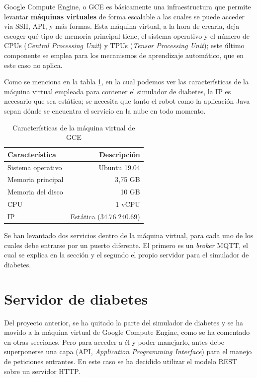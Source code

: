 \documentclass[12pt,spanish,listoffigures,listoftables]{tfgetsinf}
\begin{document}
Google Compute Engine, o GCE es básicamente una infraestructura que permite levantar \textbf{máquinas virtuales} de forma escalable a las cuales se puede acceder via SSH, API, y más formas. Esta máquina virtual, a la hora de crearla, deja escoger qué tipo de memoria principal tiene, el sistema operativo y el número de CPUs (\textit{Central Processing Unit}) y TPUs (\textit{Tensor Processing Unit}); este último componente se emplea para los mecanismos de aprendizaje automático, que en este caso no aplica.

Como se menciona en la tabla \ref{tabla:caracteristicasgce}, en la cual podemos ver las características de la máquina virtual empleada para contener el simulador de diabetes, la IP es necesario que sea estática; se necesita que tanto el robot como la aplicación Java sepan dónde se encuentra el servicio en la nube en todo momento. \\

\begin{table}[!h]
	\begin{center}
		\begin{tabular}{|l|r|}
			\hline 
			\textbf{Característica} & \textbf{Descripción} \\ 
			\hline 
			Sistema operativo & Ubuntu 19.04 \\ 
			\hline 
			Memoria principal & 3,75 GB \\ 
			\hline 
			Memoria del disco & 10 GB \\ 
			\hline 
			CPU & 1 vCPU \\ 
			\hline 
			IP & Estática (34.76.240.69) \\ 
			\hline 
		\end{tabular} 
		\caption{Características de la máquina virtual de GCE}
		\label{tabla:caracteristicasgce}
	\end{center}
\end{table}

Se han levantado dos servicios dentro de la máquina virtual, para cada uno de los cuales debe entrarse por un puerto diferente. El primero es un \textit{broker} MQTT, el cual se explica en la sección  y el segundo el propio servidor para el simulador de diabetes. \\

\section{Servidor de diabetes}

Del proyecto anterior, se ha quitado la parte del simulador de diabetes y se ha movido a la máquina virtual de Google Compute Engine, como se ha comentado en otras secciones. Pero para acceder a él y poder manejarlo, antes debe superponerse una capa (API, \textit{Application Programming Interface}) para el manejo de peticiones entrantes. En este caso se ha decidido utilizar el modelo REST sobre un servidor HTTP.
\end{document}

